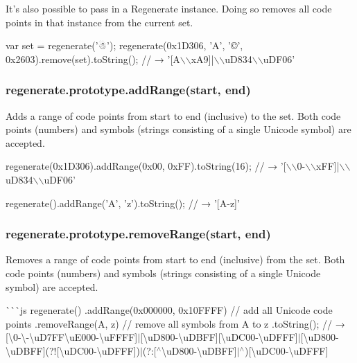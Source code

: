 It’s also possible to pass in a Regenerate instance. Doing so removes all code points in that instance from the current set.


\begin{DoxyCode}
var set = regenerate('☃');
regenerate(0x1D306, 'A', '©', 0x2603).remove(set).toString();
// → '[A\(\backslash\)\(\backslash\)xA9]|\(\backslash\)\(\backslash\)uD834\(\backslash\)\(\backslash\)uDF06'
\end{DoxyCode}


\subsubsection*{{\ttfamily regenerate.\+prototype.\+add\+Range(start, end)}}

Adds a range of code points from {\ttfamily start} to {\ttfamily end} (inclusive) to the set. Both code points (numbers) and symbols (strings consisting of a single Unicode symbol) are accepted.


\begin{DoxyCode}
regenerate(0x1D306).addRange(0x00, 0xFF).toString(16);
// → '[\(\backslash\)\(\backslash\)0-\(\backslash\)\(\backslash\)xFF]|\(\backslash\)\(\backslash\)uD834\(\backslash\)\(\backslash\)uDF06'

regenerate().addRange('A', 'z').toString();
// → '[A-z]'
\end{DoxyCode}


\subsubsection*{{\ttfamily regenerate.\+prototype.\+remove\+Range(start, end)}}

Removes a range of code points from {\ttfamily start} to {\ttfamily end} (inclusive) from the set. Both code points (numbers) and symbols (strings consisting of a single Unicode symbol) are accepted.

\`{}\`{}\`{}js regenerate() .add\+Range(0x000000, 0x10\+F\+F\+F\+F) // add all Unicode code points .remove\+Range(\textquotesingle{}A\textquotesingle{}, \textquotesingle{}z\textquotesingle{}) // remove all symbols from {\ttfamily A} to {\ttfamily z} .to\+String(); // → \textquotesingle{}\mbox{[}\textbackslash{}0-\/\textbackslash{}-\/\textbackslash{}u\+D7\+FF\textbackslash{}u\+E000-\/\textbackslash{}u\+F\+F\+FF\mbox{]}$\vert$\mbox{[}\textbackslash{}u\+D800-\/\textbackslash{}u\+D\+B\+FF\mbox{]}\mbox{[}\textbackslash{}u\+D\+C00-\/\textbackslash{}u\+D\+F\+FF\mbox{]}$\vert$\mbox{[}\textbackslash{}u\+D800-\/\textbackslash{}u\+D\+B\+FF\mbox{]}(?!\mbox{[}\textbackslash{}u\+D\+C00-\/\textbackslash{}u\+D\+F\+FF\mbox{]})$\vert$(?\+:\mbox{[}$^\wedge$\textbackslash{}u\+D800-\/\textbackslash{}u\+D\+B\+FF\mbox{]}$\vert$$^\wedge$)\mbox{[}\textbackslash{}u\+D\+C00-\/\textbackslash{}u\+D\+F\+FF\mbox{]}\textquotesingle{}

